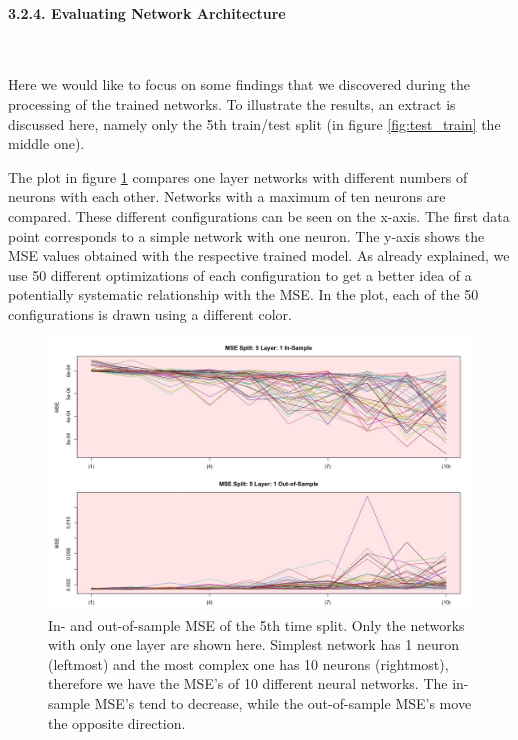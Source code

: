 \documentclass[
]{article}
\begin{document}
\newpage

\hypertarget{evaluate_nn}{%
\paragraph{3.2.4. Evaluating Network Architecture}\label{evaluate_nn}}

~

Here we would like to focus on some findings that we discovered during
the processing of the trained networks. To illustrate the results, an
extract is discussed here, namely only the 5th train/test split (in
figure \ref{fig:test_train} the middle one).

The plot in figure \ref{fig:mse_plot1} compares one layer networks with
different numbers of neurons with each other. Networks with a maximum of
ten neurons are compared. These different configurations can be seen on
the x-axis. The first data point corresponds to a simple network with
one neuron. The y-axis shows the MSE values obtained with the respective
trained model. As already explained, we use 50 different optimizations
of each configuration to get a better idea of a potentially systematic
relationship with the MSE. In the plot, each of the 50 configurations is
drawn using a different color.

\begin{figure}

{\centering \includegraphics[width=1\linewidth]{images/batch5/mse_5_layer1} 

}

\caption{In- and out-of-sample MSE of the 5th time split. Only the networks with only one layer are shown here. Simplest network has 1 neuron (leftmost) and the most complex one has 10 neurons (rightmost), therefore we have the MSE's of 10 different neural networks. The in-sample MSE's tend to decrease, while the out-of-sample MSE's move the opposite direction.}\label{fig:mse_plot1}
\end{figure}
\end{document}
